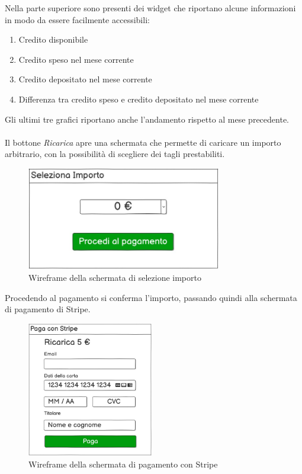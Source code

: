 Nella parte superiore sono presenti dei widget che riportano alcune informazioni in modo da essere facilmente accessibili:
\begin{enumerate}
  \item Credito disponibile
  \item Credito speso  nel mese corrente
  \item Credito depositato nel mese corrente
  \item Differenza tra credito speso e credito depositato nel mese corrente
\end{enumerate}
Gli ultimi tre grafici riportano anche l'andamento rispetto al mese precedente.
\\\\
Il bottone \textit{Ricarica} apre una schermata che permette di caricare un importo arbitrario, con la possibilit\`a di scegliere
dei tagli prestabiliti.

\begin{figure}[H]
  \centering
  \includegraphics[width=8.5cm]{images/gestione-wallet/mock-seleziona-importo.png}
  \caption{Wireframe della schermata di selezione importo }
\end{figure}
Procedendo al pagamento si conferma l'importo, passando quindi alla schermata di pagamento di Stripe.

\begin{figure}[H]
  \centering
  \includegraphics[width=5.5cm]{images/gestione-wallet/mock-stripe.png}
  \caption{Wireframe della schermata di pagamento con Stripe }
\end{figure}

